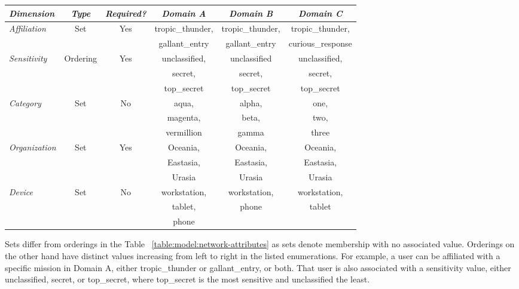 \begin{table*}[tp] %
\centering %
\begin{tabular}{lccccc}
\toprule %
\emph{Dimension}		& \emph{Type}	& \emph{Required?}	& \emph{Domain A}	& \emph{Domain B}	& \emph{Domain C} 	\\\toprule
\emph{Affiliation} 	& Set 			& Yes 				& tropic\_thunder, 	& tropic\_thunder,	& tropic\_thunder, 	\\
					&				&					& gallant\_entry		& gallant\_entry		& curious\_response	\\\midrule
\emph{Sensitivity} 	& Ordering 		& Yes 				& unclassified,		& unclassified		& unclassified,		\\
					&				&					& secret,			& secret,			& secret,			\\
					&				&					& top\_secret		& top\_secret		& top\_secret		\\\midrule
\emph{Category}		& Set 			& No 				& aqua,				& alpha,				& one,				\\
					&				&					& magenta,			& beta,				& two,				\\
					&				&					& vermillion			& gamma				& three				\\\midrule
\emph{Organization}	& Set 			& Yes 				& Oceania, 			& Oceania,			& Oceania,			\\
					&				&					& Eastasia,			& Eastasia,			& Eastasia,			\\
					&				&					& Urasia				& Urasia				& Urasia				\\\midrule
\emph{Device}	 	& Set 			& No 				& workstation, 		& workstation,		& workstation, 		\\
					&				&					& tablet,			& phone				& tablet				\\
					&				&					& phone				& 					& 					\\\midrule
\end{tabular}
\caption{All Possible Attributes for Usage Management Decisions}
\label{table:model:network-attributes}
\end{table*}

Sets differ from orderings in the Table ~\ref{table:model:network-attributes} as sets denote membership with no associated value.  Orderings on the other hand have distinct values increasing from left to right in the listed enumerations.  For example, a user can be affiliated with a specific mission in Domain A, either tropic\_thunder or gallant\_entry, or both.  That user is also associated with a sensitivity value, either unclassified, secret, or top\_secret, where top\_secret is the most sensitive and unclassified the least.

